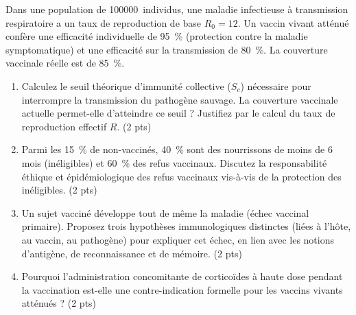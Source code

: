 \documentclass[11pt]{article}
\begin{document}
\begin{exercice}
Dans une population de \SI{100 000}{individus}, une maladie infectieuse à transmission respiratoire a un taux de reproduction de base $R_0 = 12$. Un vaccin vivant atténué confère une efficacité individuelle de \SI{95}{\%} (protection contre la maladie symptomatique) et une efficacité sur la transmission de \SI{80}{\%}. La couverture vaccinale réelle est de \SI{85}{\%}.

\begin{enumerate}
    \item Calculez le seuil théorique d'immunité collective ($S_c$) nécessaire pour interrompre la transmission du pathogène sauvage. La couverture vaccinale actuelle permet-elle d'atteindre ce seuil ? Justifiez par le calcul du taux de reproduction effectif $R$. \hfill (2 pts)
    \item Parmi les \SI{15}{\%} de non-vaccinés, \SI{40}{\%} sont des nourrissons de moins de 6 mois (inéligibles) et \SI{60}{\%} des refus vaccinaux. Discutez la responsabilité éthique et épidémiologique des refus vaccinaux vis-à-vis de la protection des inéligibles. \hfill (2 pts)
    \item Un sujet vacciné développe tout de même la maladie (échec vaccinal primaire). Proposez trois hypothèses immunologiques distinctes (liées à l'hôte, au vaccin, au pathogène) pour expliquer cet échec, en lien avec les notions d'antigène, de reconnaissance et de mémoire. \hfill (2 pts)
    \item Pourquoi l'administration concomitante de corticoïdes à haute dose pendant la vaccination est-elle une contre-indication formelle pour les vaccins vivants atténués ? \hfill (2 pts)
\end{enumerate}
\end{exercice}
\end{document}
